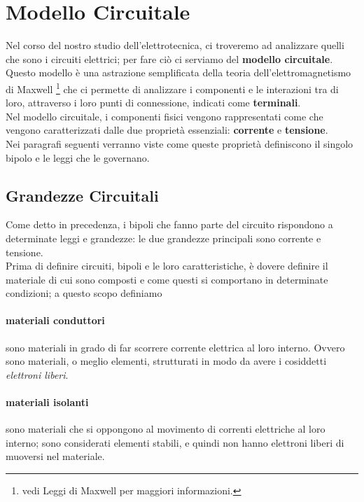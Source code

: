 \section{Modello Circuitale}
Nel corso del nostro studio dell'elettrotecnica, ci troveremo ad analizzare quelli che sono i circuiti elettrici; per fare ciò ci serviamo del \textbf{modello circuitale}.
Questo modello è una astrazione semplificata della teoria dell'elettromagnetismo di Maxwell \footnote{vedi Leggi di Maxwell per maggiori informazioni.} che ci permette di analizzare i componenti e le interazioni tra di loro, attraverso i loro punti di connessione, indicati come \textbf{terminali}.\\
Nel modello circuitale, i componenti fisici vengono rappresentati come  che vengono caratterizzati dalle due proprietà essenziali: \textbf{corrente} e \textbf{tensione}. \\
Nei paragrafi seguenti verranno viste come queste proprietà definiscono il singolo bipolo e le leggi che le governano.

\subsection{Grandezze Circuitali}
Come detto in precedenza, i bipoli che fanno parte del circuito rispondono a determinate leggi e grandezze: le due grandezze principali sono corrente e tensione.\\
Prima di definire circuiti, bipoli e le loro caratteristiche, è dovere definire il materiale di cui sono composti e come questi si comportano in determinate condizioni; a questo scopo definiamo 

\paragraph{materiali conduttori} sono materiali in grado di far scorrere corrente elettrica al loro interno. Ovvero sono materiali, o meglio elementi, strutturati in modo da avere i cosiddetti \textit{elettroni liberi}.
\paragraph{materiali isolanti} sono materiali che si oppongono al movimento di correnti elettriche al loro interno; sono considerati elementi stabili, e quindi non hanno elettroni liberi di muoversi nel materiale.

